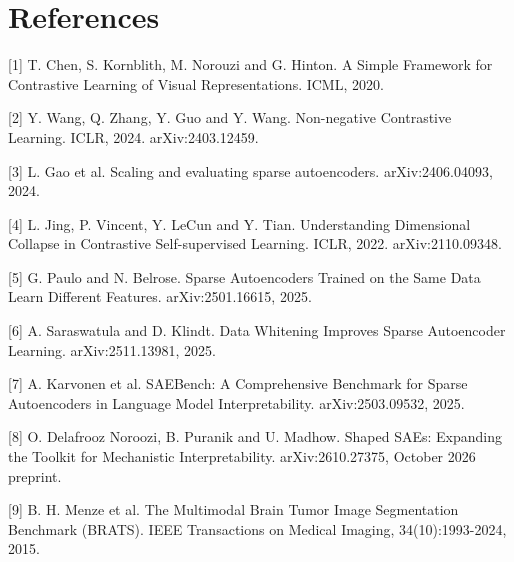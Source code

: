 \documentclass[10pt]{article}
\begin{document}
\clearpage
\section*{References}
[1] T. Chen, S. Kornblith, M. Norouzi and G. Hinton. A Simple Framework for Contrastive Learning of Visual Representations. ICML, 2020.

[2] Y. Wang, Q. Zhang, Y. Guo and Y. Wang. Non-negative Contrastive Learning. ICLR, 2024. arXiv:2403.12459.

[3] L. Gao et al. Scaling and evaluating sparse autoencoders. arXiv:2406.04093, 2024.

[4] L. Jing, P. Vincent, Y. LeCun and Y. Tian. Understanding Dimensional Collapse in Contrastive Self-supervised Learning. ICLR, 2022. arXiv:2110.09348.

[5] G. Paulo and N. Belrose. Sparse Autoencoders Trained on the Same Data Learn Different Features. arXiv:2501.16615, 2025.

[6] A. Saraswatula and D. Klindt. Data Whitening Improves Sparse Autoencoder Learning. arXiv:2511.13981, 2025.

[7] A. Karvonen et al. SAEBench: A Comprehensive Benchmark for Sparse Autoencoders in Language Model Interpretability. arXiv:2503.09532, 2025.

[8] O. Delafrooz Noroozi, B. Puranik and U. Madhow. Shaped SAEs: Expanding the Toolkit for Mechanistic Interpretability. arXiv:2610.27375, October 2026 preprint.

[9] B. H. Menze et al. The Multimodal Brain Tumor Image Segmentation Benchmark (BRATS). IEEE Transactions on Medical Imaging, 34(10):1993-2024, 2015.
\end{document}
